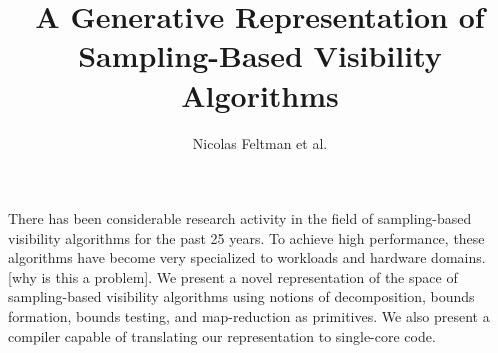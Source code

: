 \documentclass{article}
\title{\Large\textbf{A Generative Representation of Sampling-Based Visibility Algorithms}}
\author{Nicolas Feltman et al.}
\begin{document}
\maketitle

\begin{center}
There has been considerable research activity in the field of sampling-based visibility algorithms for the past 25 years.  To achieve high performance, these algorithms have become very specialized to workloads and hardware domains.  [why is this a problem]. We present a novel representation of the space of sampling-based visibility algorithms using notions of decomposition, bounds formation, bounds testing, and map-reduction as primitives.  We also present a compiler capable of translating our representation to single-core code. 
\end{center}
\end{document}
